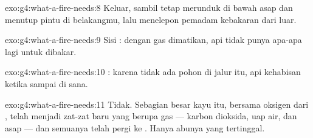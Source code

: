 \begin{solution}{exo:g4:what-a-fire-needs:8}
Keluar, sambil tetap merunduk di bawah asap dan menutup pintu di
belakangmu, lalu menelepon pemadam kebakaran dari luar.
\end{solution}

\begin{solution}{exo:g4:what-a-fire-needs:9}
Sisi : dengan gas dimatikan, api tidak punya apa-apa lagi
untuk dibakar.
\end{solution}

\begin{solution}{exo:g4:what-a-fire-needs:10}
: karena tidak ada pohon di jalur itu, api kehabisan  ketika sampai di sana.
\end{solution}

\begin{solution}{exo:g4:what-a-fire-needs:11}
Tidak. Sebagian besar kayu itu, bersama oksigen dari , telah
menjadi zat-zat baru yang berupa gas --- karbon dioksida, uap air, dan
asap --- dan semuanya telah pergi ke . Hanya abunya yang
tertinggal.
\end{solution}
